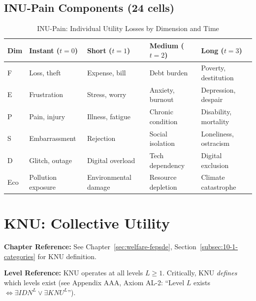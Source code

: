 \subsection{INU-Pain Components (24 cells)}

\begin{table}[htbp]
\centering
\caption{INU-Pain: Individual Utility Losses by Dimension and Time}
\label{tab:app-c-inu-pain}
\small
\renewcommand{\arraystretch}{1.2}
\begin{tabular}{@{}lp{2.8cm}p{2.8cm}p{2.8cm}p{2.8cm}@{}}
\toprule
\textbf{Dim} & \textbf{Instant ($t=0$)} & \textbf{Short ($t=1$)} & \textbf{Medium ($t=2$)} & \textbf{Long ($t=3$)} \\
\midrule
F & Loss, theft & Expense, bill & Debt burden & Poverty, destitution \\
E & Frustration & Stress, worry & Anxiety, burnout & Depression, despair \\
P & Pain, injury & Illness, fatigue & Chronic condition & Disability, mortality \\
S & Embarrassment & Rejection & Social isolation & Loneliness, ostracism \\
D & Glitch, outage & Digital overload & Tech dependency & Digital exclusion \\
Eco & Pollution exposure & Environmental damage & Resource depletion & Climate catastrophe \\
\bottomrule
\end{tabular}
\end{table}

\section{KNU: Collective Utility}
\label{sec:app-c-knu}

\begin{cross-reference}
\textbf{Chapter Reference:} See Chapter~\ref{sec:welfare-fepsde}, 
Section~\ref{subsec:10-1-categories} for KNU definition.

\textbf{Level Reference:} KNU operates at all levels $L \geq 1$. Critically, 
KNU \textit{defines} which levels exist (see Appendix AAA, Axiom AL-2: 
``Level $L$ exists $\iff \exists IDN^L \lor \exists KNU^L$'').
\end{cross-reference}

